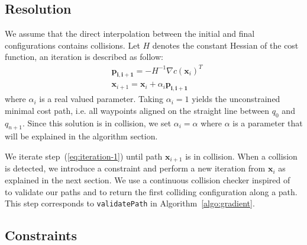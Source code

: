 \documentclass{tADR2e}
\newcommand\pii{\mathbf{p_{i,i+1}}}
\newcommand\xx{\mathbf{x}}
\begin{document}
\subsection {Resolution}
We assume that the direct interpolation between the initial and final configurations contains collisions.
Let $H$ denotes the constant Hessian of the cost function, an iteration is 
described as follow:
\begin{equation}\label{eq:iteration-1}
\begin{split}
& \pii =  -H^{-1} \nabla c(\xx_i)^{T} \\
& \xx_{i+1} =  \xx_{i} + \alpha_i \pii
\end{split} 
\end{equation}
where $\alpha_i$ is a real valued parameter. Taking $\alpha_i=1$ yields the 
unconstrained minimal cost path, i.e. all waypoints aligned on the straight line 
between $q_0$ and $q_{n+1}$. Since this solution is in collision, we set 
$\alpha_i = \alpha$ 
where $\alpha$ is a parameter that will be explained in the algorithm section.

We iterate step~(\ref{eq:iteration-1}) until path $\xx_{i+1}$ is in collision. 
When a collision is detected, we introduce a constraint and perform a new 
iteration from $\xx_i$ as explained in the next section. We use a continuous 
collision checker inspired of~\cite{SchwarzerExactCollision} to validate our 
paths and to return the first colliding configuration along a path. This step corresponds to \texttt{validatePath} in Algorithm~\ref{algo:gradient}.

\subsection{Constraints}
\end{document}
